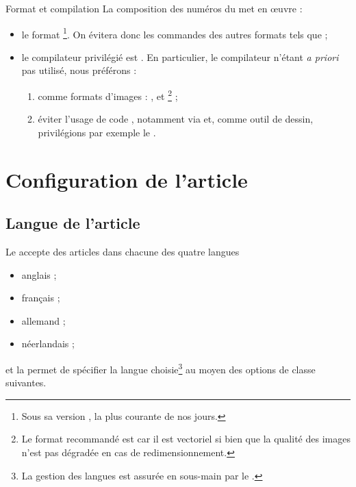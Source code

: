 \documentclass[french,nolocaltoc]{nwejmart}
\newtheorem[style=definition]{fait}
\newtheorem[title=contraventionnalisation]{ctrv}
\newtheorem[title-plural=anneaux]{anneau}
\newtheorem[title-plural=idéaux]{idéal}
\begin{document}
\begin{dbwarning}{Format et compilation }{}
  La composition des numéros du \nwejm*{} met en œuvre :
  \begin{itemize}
  \item le format \footnote{Sous sa version , la
      plus courante de nos jours.}. On évitera donc les commandes des autres
    formats tels que  ;
  \item le compilateur privilégié est . En particulier, le
    compilateur  n'étant \emph{a priori} pas utilisé, nous
    préférons :
    \begin{enumerate}
    \item comme formats d'images : ,  et
      \footnote{Le format recommandé est  car il est
        vectoriel si bien que la qualité des images n'est pas dégradée en cas de
        redimensionnement.} ;
    \item éviter l'usage de code , notamment via
       et, comme outil de dessin, privilégions par exemple le
      .
    \end{enumerate}
  \end{itemize}
\end{dbwarning}

\section{Configuration de l'article}

\subsection{Langue de l'article}
\label{sec:langue-de-larticle}

Le \nwejm{} accepte des articles dans chacune des quatre langues
\begin{itemize}
\item anglais ;
\item français ;
\item allemand ;
\item néerlandais ;
\end{itemize}
et la \nwejmauthorcl{} permet de spécifier la langue choisie\footnote{La gestion
  des langues est assurée en sous-main par le .} au moyen des
options de classe suivantes.
\end{document}
